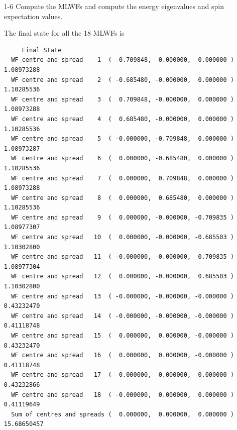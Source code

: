 \begin{itemize}
	\item[1-6] {Compute the MLWFs and compute the energy eigenvalues and spin expectation values.}

	The final state for all the 18 MLWFs is
	\begin{tcolorbox}[sharp corners,boxrule=0.5pt]
	{\small
	\begin{verbatim}
	 Final State
  WF centre and spread    1  ( -0.709848,  0.000000,  0.000000 )     1.08973288
  WF centre and spread    2  ( -0.685480, -0.000000,  0.000000 )     1.10285536
  WF centre and spread    3  (  0.709848, -0.000000,  0.000000 )     1.08973288
  WF centre and spread    4  (  0.685480, -0.000000,  0.000000 )     1.10285536
  WF centre and spread    5  ( -0.000000, -0.709848,  0.000000 )     1.08973287
  WF centre and spread    6  (  0.000000, -0.685480,  0.000000 )     1.10285536
  WF centre and spread    7  (  0.000000,  0.709848,  0.000000 )     1.08973288
  WF centre and spread    8  (  0.000000,  0.685480,  0.000000 )     1.10285536
  WF centre and spread    9  (  0.000000, -0.000000, -0.709835 )     1.08977307
  WF centre and spread   10  (  0.000000, -0.000000, -0.685503 )     1.10302800
  WF centre and spread   11  ( -0.000000, -0.000000,  0.709835 )     1.08977304
  WF centre and spread   12  (  0.000000, -0.000000,  0.685503 )     1.10302800
  WF centre and spread   13  ( -0.000000, -0.000000, -0.000000 )     0.43232470
  WF centre and spread   14  ( -0.000000, -0.000000, -0.000000 )     0.41118748
  WF centre and spread   15  (  0.000000,  0.000000, -0.000000 )     0.43232470
  WF centre and spread   16  (  0.000000,  0.000000, -0.000000 )     0.41118748
  WF centre and spread   17  ( -0.000000,  0.000000,  0.000000 )     0.43232866
  WF centre and spread   18  ( -0.000000,  0.000000,  0.000000 )     0.41119649
  Sum of centres and spreads (  0.000000,  0.000000,  0.000000 )    15.68650457


\end{verbatim}}
\end{tcolorbox}
\end{itemize}
